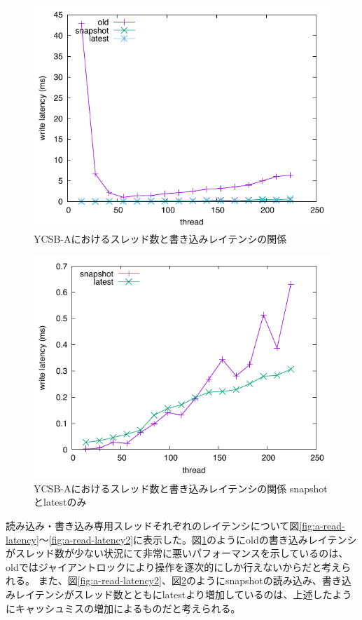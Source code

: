 \documentclass[a4paper]{jreport}	%
\begin{document}
\begin{figure}[h] 
\centering
\includegraphics[width=15cm]{ycsb-a/opposite-write-latency}
\caption{YCSB-Aにおけるスレッド数と書き込みレイテンシの関係}
\label{fig:a-write-latency}
\end{figure}

\begin{figure}[h] 
\centering
\includegraphics[width=15cm]{ycsb-a/opposite-write-latency2}
\caption{YCSB-Aにおけるスレッド数と書き込みレイテンシの関係 snapshotとlatestのみ}
\label{fig:a-write-latency2}
\end{figure}

読み込み・書き込み専用スレッドそれぞれのレイテンシについて図\ref{fig:a-read-latency}〜\ref{fig:a-read-latency2}に表示した。図\ref{fig:a-write-latency}のようにoldの書き込みレイテンシがスレッド数が少ない状況にて非常に悪いパフォーマンスを示しているのは、oldではジャイアントロックにより操作を逐次的にしか行えないからだと考えられる。
また、図\ref{fig:a-read-latency2}、図\ref{fig:a-write-latency2}のようにsnapshotの読み込み、書き込みレイテンシがスレッド数とともにlatestより増加しているのは、上述したようにキャッシュミスの増加によるものだと考えられる。
\end{document}
